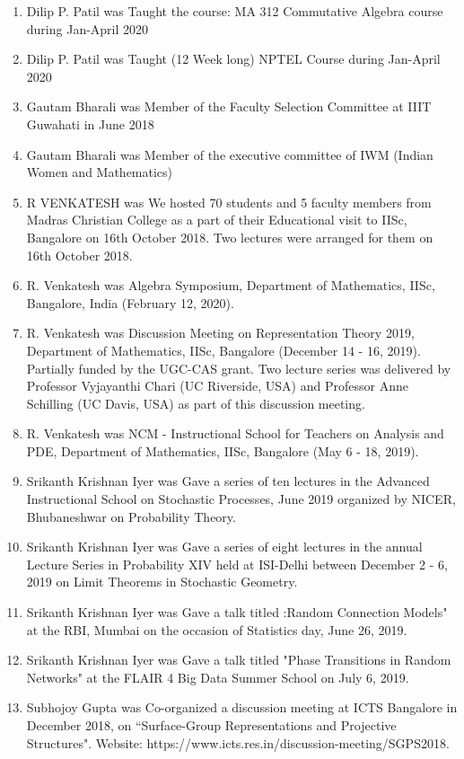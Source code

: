 \begin{enumerate}
\item Dilip P. Patil was Taught the course: MA 312 Commutative Algebra course during Jan-April 2020
\item Dilip P. Patil was Taught  (12 Week long)  NPTEL Course during Jan-April 2020
\item Gautam Bharali was Member of the Faculty Selection Committee at IIIT Guwahati in June 2018
\item Gautam Bharali was Member of the executive committee of IWM (Indian Women and Mathematics)  
\item R VENKATESH was We hosted 70 students and 5 faculty members from Madras Christian College as a part of their Educational visit to IISc, Bangalore on 16th October 2018. Two lectures were arranged for them on 16th October 2018. 
\item R. Venkatesh was Algebra Symposium, Department of Mathematics, IISc, Bangalore, India (February 12, 2020).
\item R. Venkatesh was Discussion Meeting on Representation Theory 2019, Department of Mathematics, IISc, Bangalore (December 14 - 16, 2019). Partially funded by the UGC-CAS grant.  Two lecture series was delivered by Professor Vyjayanthi Chari (UC Riverside, USA) and Professor Anne Schilling (UC Davis, USA) as part of this discussion meeting.
\item R. Venkatesh was NCM - Instructional School for Teachers on Analysis and PDE, Department of Mathematics, IISc, Bangalore (May 6 - 18, 2019). 
\item Srikanth Krishnan Iyer was Gave a series of ten lectures in the Advanced Instructional School on Stochastic Processes, June 2019 organized by NICER, Bhubaneshwar on Probability Theory.
\item Srikanth Krishnan Iyer was Gave a series of eight lectures in the annual Lecture Series in Probability XIV held at ISI-Delhi between December 2 - 6, 2019 on Limit Theorems in Stochastic Geometry.
\item Srikanth Krishnan Iyer was Gave a talk titled :Random Connection Models" at the RBI, Mumbai on the occasion of Statistics day, June 26, 2019.
\item Srikanth Krishnan Iyer was Gave a talk titled "Phase Transitions in Random Networks" at the FLAIR 4 Big Data Summer School on July 6, 2019.
\item Subhojoy Gupta was Co-organized a discussion meeting at ICTS Bangalore in December 2018, on “Surface-Group Representations and Projective Structures". Website: https://www.icts.res.in/discussion-meeting/SGPS2018.

\end{enumerate}
